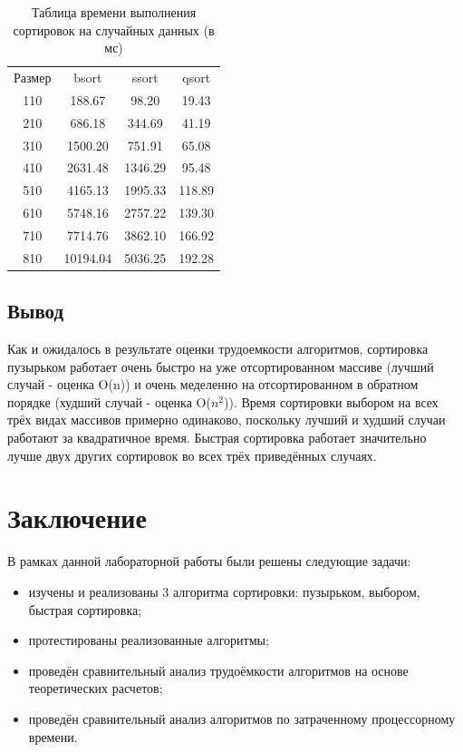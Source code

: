 \documentclass{report}
\begin{document}
\begin{table} [h!]
	\caption{Таблица времени выполнения сортировок на случайных данных (в мс)}
	\begin{center}
	\begin{tabular}{|c c c c|}

		\hline

		Размер & bsort & ssort  & qsort \\ [0.5ex]
110 & 188.67 & 98.20 & 19.43  \\ 
\hline
210 & 686.18 & 344.69 & 41.19  \\ 
\hline
310 & 1500.20 & 751.91 & 65.08  \\ 
\hline
410 & 2631.48 & 1346.29 & 95.48  \\ 
\hline
510 & 4165.13 & 1995.33 & 118.89  \\ 
\hline
610 & 5748.16 & 2757.22 & 139.30  \\ 
\hline
710 & 7714.76 & 3862.10 & 166.92  \\ 
\hline
810 & 10194.04 & 5036.25 & 192.28  \\ 
\hline

	\end{tabular}
	\end{center}
\end{table}

\section{Вывод}

Как и ожидалось в результате оценки трудоемкости алгоритмов, сортировка пузырьком работает очень быстро на уже отсортированном массиве (лучший случай - оценка O(n)) и очень меделенно на отсортированном в обратном порядке (худший случай - оценка O($n^2$)). Время сортировки выбором на всех трёх видах массивов примерно одинаково, поскольку лучший и худший случаи работают за квадратичное время. Быстрая сортировка работает значительно лучше двух других сортировок во всех трёх приведённых случаях.


\chapter*{Заключение}

В рамках данной лабораторной работы были решены следующие задачи:

\begin{itemize}
	\item изучены и реализованы 3 алгоритма сортировки: пузырьком, выбором, быстрая сортировка;
	\item протестированы реализованные алгоритмы;
	\item проведён сравнительный анализ трудоёмкости алгоритмов на основе теоретических расчетов;
	\item проведён сравнительный анализ алгоритмов по затраченному процессорному времени.
\end{itemize}
\end{document}
